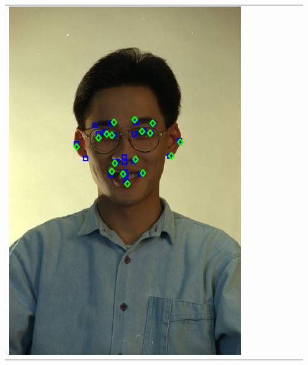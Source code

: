 \documentclass[landscape,final,a0paper,fontscale=0.27065]{baposter}
\begin{document}
\begin{poster}
{{\begin{tabular}{@{}rccccccc@{}}
 \parbox[c]{0.11\linewidth}{\includegraphics[width=\linewidth]{images/l_fb_success_1.pdf}} &

\end{tabular}}}
\end{poster}
\end{document}
